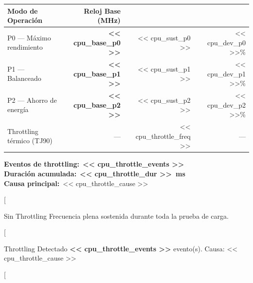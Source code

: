 \documentclass[11pt, a4paper, final]{article}
\newcommand{\mv}[1]{\textcolor{AMPrimary}{\textbf{#1}}}
\newcommand{\rowalt}{\rowcolor{AMLight}}
\newcommand{\thcell}[1]{\color{AMPrimary}\textbf{#1}}
\begin{document}
\begin{tabularx}{\linewidth}{@{} X r r r @{}}
  \toprule
  \thcell{Modo de Operación} &
  \thcell{Reloj Base (MHz)} &
  \thcell{[%
  \thcell{Desviación} \\
  \midrule
  P0 --- Máximo rendimiento  & \mv{<< cpu_base_p0 >>} & << cpu_sust_p0 >> & << cpu_dev_p0 >>\% \\
  \rowalt
  P1 --- Balanceado          & \mv{<< cpu_base_p1 >>} & << cpu_sust_p1 >> & << cpu_dev_p1 >>\% \\
  P2 --- Ahorro de energía   & \mv{<< cpu_base_p2 >>} & << cpu_sust_p2 >> & << cpu_dev_p2 >>\% \\
  \rowalt
  Throttling térmico (TJ90)  & ---                    & << cpu_throttle_freq >> & --- \\
  \bottomrule
\end{tabularx}

\vspace{0.3cm}

\begin{minipage}[t]{0.48\linewidth}
  \vspace{0pt} %
  \small
  \textbf{Eventos de throttling:}\ \mv{<< cpu_throttle_events >>}\\
  \textbf{Duración acumulada:}\ \mv{<< cpu_throttle_dur >>\ ms}\\
  \textbf{Causa principal:}\ << cpu_throttle_cause >>
\end{minipage}
\hfill
\begin{minipage}[t]{0.48\linewidth}
  \vspace{0pt} %
  [%
  \begin{amboxok}{Sin Throttling}
    \scriptsize Frecuencia plena sostenida durante toda la prueba de carga.
  \end{amboxok}
  [%
  \begin{amboxwarn}{Throttling Detectado}
    \scriptsize \mv{<< cpu_throttle_events >>} evento(s). Causa: << cpu_throttle_cause >>
  \end{amboxwarn}
  [%
\end{minipage}

\vspace{0.6cm}


\end{document}
